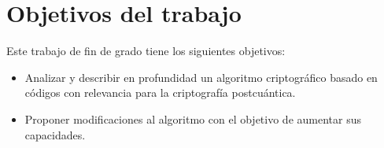 \section{Objetivos del trabajo}

Este trabajo de fin de grado tiene los siguientes objetivos:
\begin{itemize}
	\item Analizar y describir en profundidad un algoritmo criptográfico basado en códigos con relevancia para la criptografía postcuántica.
	\item Proponer modificaciones al algoritmo con el objetivo de aumentar sus capacidades.
\end{itemize}
